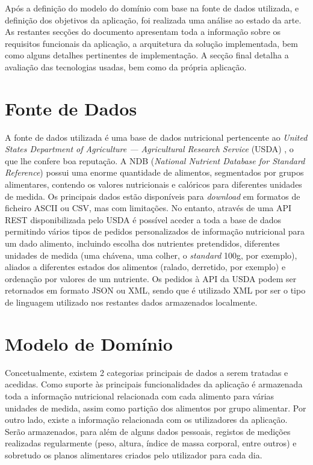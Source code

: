 \documentclass[twocolumn,twoside,11pt,a4paper]{article}
\begin{document}
Após a definição do modelo do domínio com base na fonte de dados utilizada, e definição dos objetivos da aplicação, foi realizada uma análise ao estado da arte. As restantes secções do documento apresentam toda a informação sobre os requisitos funcionais da aplicação, a arquitetura da solução implementada, bem como alguns detalhes pertinentes de implementação. A secção final detalha a avaliação das tecnologias usadas, bem como da própria aplicação.



\section{Fonte de Dados}
A fonte de dados utilizada é uma base de dados nutricional pertencente ao \textit{United States Department of Agriculture — Agricultural Research Service} (USDA) \cite{usda}, o que lhe confere boa reputação. A NDB (\textit{National Nutrient Database for Standard Reference}) \cite{ndb} possui uma enorme quantidade de alimentos, segmentados por grupos alimentares, contendo os valores nutricionais e calóricos para diferentes unidades de medida. Os principais dados estão disponíveis para \textit{download} em formatos de ficheiro ASCII ou CSV, mas com limitações. No entanto, através de uma API REST disponibilizada pelo USDA é possível aceder a toda a base de dados permitindo vários tipos de pedidos personalizados de informação nutricional para um dado alimento, incluindo escolha dos nutrientes pretendidos, diferentes unidades de medida (uma chávena, uma colher, o \textit{standard} 100g, por exemplo), aliados a diferentes estados dos alimentos (ralado, derretido, por exemplo) e ordenação por valores de um nutriente.
Os pedidos à API da USDA podem ser retornados em formato JSON ou XML, sendo que é utilizado XML por ser o tipo de linguagem utilizado nos restantes dados armazenados localmente.


\section{Modelo de Domínio}
Concetualmente, existem 2 categorias principais de dados a serem tratadas e acedidas. Como suporte às principais funcionalidades da aplicação é armazenada toda a informação nutricional relacionada com cada alimento para várias unidades de medida, assim como partição dos alimentos por grupo alimentar. Por outro lado, existe a informação relacionada com os utilizadores da aplicação. Serão armazenados, para além de alguns dados pessoais, registos de medições realizadas regularmente (peso, altura, índice de massa corporal, entre outros) e sobretudo os planos alimentares criados pelo utilizador para cada dia.
\end{document}
